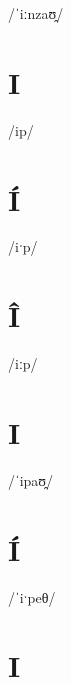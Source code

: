 \documentclass[10pt,a4paper,twoside]{book}
\begin{document}
\begin{multicols}{3}
 {/ˈiːnzaʊ̯/} {}
\end{multicols}

\section*{I}

\begin{multicols}{3}
 {/ip/} {}
\end{multicols}

\section*{Í}

\begin{multicols}{3}
 {/iˑp/} {}
\end{multicols}

\section*{Î}

\begin{multicols}{3}
 {/iːp/} {}
\end{multicols}

\section*{I}

\begin{multicols}{3}
 {/ˈipaʊ̯/} {}
\end{multicols}

\section*{Í}

\begin{multicols}{3}
 {/ˈiˑpeθ/} {}
\end{multicols}

\section*{I}
\end{document}
